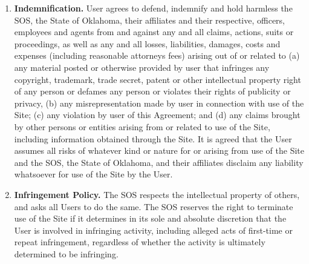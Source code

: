 \begin{enumerate}
    \item \textbf{Indemnification.} User agrees to defend, indemnify and hold
    harmless the SOS, the State of Oklahoma, their affiliates and their
    respective, officers, employees and agents from and against any and all
    claims, actions, suits or proceedings, as well as any and all losses,
    liabilities, damages, costs and expenses (including reasonable attorneys
    fees) arising out of or related to (a) any material posted or otherwise
    provided by user that infringes any copyright, trademark, trade secret,
    patent or other intellectual property right of any person or defames any
    person or violates their rights of publicity or privacy, (b) any
    misrepresentation made by user in connection with use of the Site; (c) any
    violation by user of this Agreement; and (d) any claims brought by other
    persons or entities arising from or related to use of the Site, including
    information obtained through the Site. It is agreed that the User assumes
    all risks of whatever kind or nature for or arising from use of the Site and
    the SOS, the State of Oklahoma, and their affiliates disclaim any liability
    whatsoever for use of the Site by the User.

    \item \textbf{Infringement Policy.} The SOS respects the intellectual
    property of others, and asks all Users to do the same. The SOS reserves the
    right to terminate use of the Site if it determines in its sole and absolute
    discretion that the User is involved in infringing activity, including
    alleged acts of first-time or repeat infringement, regardless of whether the
    activity is ultimately determined to be infringing.


\end{enumerate}
